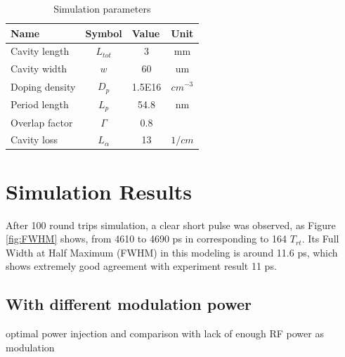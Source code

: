 \documentclass[11pt,final]{scrbook}
\begin{document}
\begin{table}[]
\centering
\caption{Simulation parameters}
\label{SIMparameter}
\begin{tabular}{llll}
\hline
\multicolumn{1}{|l|}{\textbf{Name}}  & \multicolumn{1}{l|}{\textbf{Symbol}} & \multicolumn{1}{l|}{\textbf{Value}} & \multicolumn{1}{l|}{\textbf{Unit}}         \\ \hline
\multicolumn{1}{|l|}{Cavity length}  & \multicolumn{1}{c|}{$L_{tot}$}       & \multicolumn{1}{c|}{3}              & \multicolumn{1}{c|}{mm}                    \\ %
\multicolumn{1}{|l|}{Cavity width}  & \multicolumn{1}{c|}{$w$}   & \multicolumn{1}{c|}{60}              & \multicolumn{1}{c|}{um}                    \\ %
\multicolumn{1}{|l|}{Doping density} & \multicolumn{1}{c|}{$D_{p}$ }        & \multicolumn{1}{c|}{1.5E16}         & \multicolumn{1}{c|}{$cm^{-3}$} 			   \\ %
\multicolumn{1}{|l|}{Period length}  & \multicolumn{1}{c|}{$L_{p}$}         & \multicolumn{1}{c|}{54.8}           & \multicolumn{1}{c|}{nm}                    \\ %
\multicolumn{1}{|l|}{Overlap factor} & \multicolumn{1}{c|}{$\Gamma$}          & \multicolumn{1}{c|}{0.8}          & \multicolumn{1}{c|}{}                      \\ 
 \multicolumn{1}{|l|}{Cavity loss}     &  \multicolumn{1}{c|}{$L_{\alpha}$}    &\multicolumn{1}{c|}{13}				&  \multicolumn{1}{c|}{$1/cm$} 						\\ \hline
\end{tabular}
\end{table}


\section{Simulation Results}
After 100 round trips simulation, a clear short pulse was observed, as Figure \ref{fig:FWHM} shows, from 4610 to 4690 ps in corresponding to 164 $T_{rt}$. Its Full Width at Half Maximum (FWHM) in this modeling is around 11.6 ps, which shows extremely good agreement with experiment result 11 ps\cite{gellie2010injection}.

\subsection{With different modulation power} 
optimal power injection and comparison with lack of enough RF power as modulation
\end{document}

